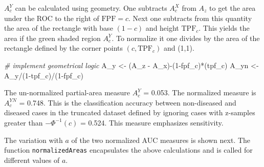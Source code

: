 \documentclass[
]{book}
\newenvironment{Shaded}{\begin{snugshade}}{\end{snugshade}}
\newcommand{\AttributeTok}[1]{\textcolor[rgb]{0.77,0.63,0.00}{#1}}
\newcommand{\CommentTok}[1]{\textcolor[rgb]{0.56,0.35,0.01}{\textit{#1}}}
\newcommand{\ControlFlowTok}[1]{\textcolor[rgb]{0.13,0.29,0.53}{\textbf{#1}}}
\newcommand{\DecValTok}[1]{\textcolor[rgb]{0.00,0.00,0.81}{#1}}
\newcommand{\FloatTok}[1]{\textcolor[rgb]{0.00,0.00,0.81}{#1}}
\newcommand{\FunctionTok}[1]{\textcolor[rgb]{0.00,0.00,0.00}{#1}}
\newcommand{\NormalTok}[1]{#1}
\newcommand{\OtherTok}[1]{\textcolor[rgb]{0.56,0.35,0.01}{#1}}
\newcommand{\SpecialCharTok}[1]{\textcolor[rgb]{0.00,0.00,0.00}{#1}}
\begin{document}
\(A_c^{Y}\) can be calculated using geometry. One subtracts \(A_c^{X}\) from \(A_z\) to get the area under the ROC to the right of \(\text{FPF}=c\). Next one subtracts from this quantity the area of the rectangle with base \((1 - c)\) and height \(\text{TPF}_c\). This yields the area if the green shaded region \(A_c^{Y}\). To normalize it one divides by the area of the rectangle defined by the corner points \((c,\text{TPF}_c)\) and (1,1).

\begin{Shaded}
\begin{Highlighting}[]
\CommentTok{\# implement geometrical logic}
\NormalTok{A\_y }\OtherTok{\textless{}{-}}\NormalTok{ (A\_z }\SpecialCharTok{{-}}\NormalTok{ A\_x)}\SpecialCharTok{{-}}\NormalTok{(}\DecValTok{1}\SpecialCharTok{{-}}\NormalTok{fpf\_c)}\SpecialCharTok{*}\NormalTok{(tpf\_c)}
\NormalTok{A\_yn }\OtherTok{\textless{}{-}}\NormalTok{ A\_y}\SpecialCharTok{/}\NormalTok{(}\DecValTok{1}\SpecialCharTok{{-}}\NormalTok{tpf\_c)}\SpecialCharTok{/}\NormalTok{(}\DecValTok{1}\SpecialCharTok{{-}}\NormalTok{fpf\_c) }
\end{Highlighting}
\end{Shaded}

The un-normalized partial-area measure \(A_c^{Y}\) = 0.053. The normalized measure is \(A_c^{YN}\) = 0.748. This is the classification accuracy between non-diseased and diseased cases in the truncated dataset defined by ignoring cases with z-samples greater than \(-\Phi^{-1}(c)\) = 0.524. This measure emphasizes sensitivity.

The variation with \(a\) of the two normalized AUC measures is shown next. The function \texttt{normalizedAreas} encapsulates the above calculations and is called for different values of \(a\).

\begin{Shaded}
\end{Shaded}
\end{document}
